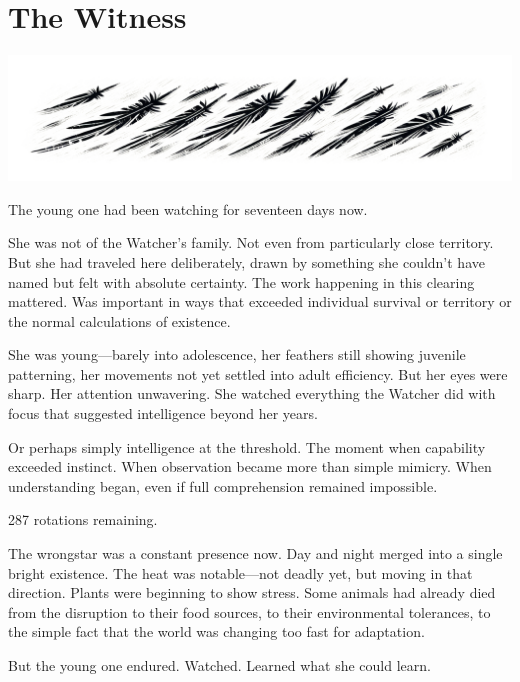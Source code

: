 \chapter{The Witness}
\label{ch:12}



\begin{center}
\includegraphics[width=\textwidth]{images/chapterImages/genesis_sketch_00089_.png}
\end{center}

The young one had been watching for seventeen days now.

She was not of the Watcher's family. Not even from particularly close territory. But she had traveled here deliberately, drawn by something she couldn't have named but felt with absolute certainty. The work happening in this clearing mattered. Was important in ways that exceeded individual survival or territory or the normal calculations of existence.

She was young—barely into adolescence, her feathers still showing juvenile patterning, her movements not yet settled into adult efficiency. But her eyes were sharp. Her attention unwavering. She watched everything the Watcher did with focus that suggested intelligence beyond her years.

Or perhaps simply intelligence at the threshold. The moment when capability exceeded instinct. When observation became more than simple mimicry. When understanding began, even if full comprehension remained impossible.

287 rotations remaining.

The wrongstar was a constant presence now. Day and night merged into a single bright existence. The heat was notable—not deadly yet, but moving in that direction. Plants were beginning to show stress. Some animals had already died from the disruption to their food sources, to their environmental tolerances, to the simple fact that the world was changing too fast for adaptation.

But the young one endured. Watched. Learned what she could learn.

\scenebreak

